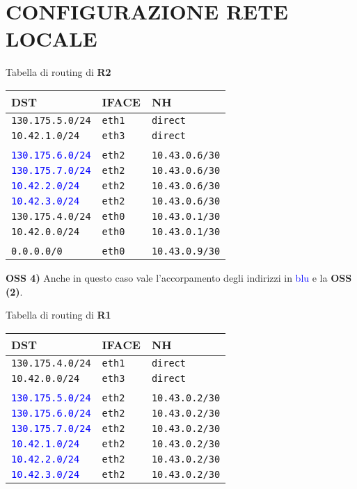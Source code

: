 \documentclass{article}
\def\code#1{\texttt{#1}}
\newenvironment{homeworkProblem}[1][-1]{
    \section{CONFIGURAZIONE RETE LOCALE}
}{}
\begin{document}
\begin{homeworkProblem}
	\pagebreak
	Tabella di routing di \textbf{R2}\\
	\begin{center}
 	\begin{tabular}{l l l}
  		\textbf{DST} & \textbf{IFACE} & \textbf{NH} \\
  		\hline
 		\code{130.175.5.0/24} & \code{eth1} & \code{direct} \\
 		\code{10.42.1.0/24}   & \code{eth3} & \code{direct} \\\\	
 		
 		\textcolor{blue}{\code{130.175.6.0/24}} & \code{eth2} & \code{10.43.0.6/30}\\
 		\textcolor{blue}{\code{130.175.7.0/24}} & \code{eth2} & \code{10.43.0.6/30}\\
 		\textcolor{blue}{\code{10.42.2.0/24}}   & \code{eth2} & \code{10.43.0.6/30}\\
 		\textcolor{blue}{\code{10.42.3.0/24}}   & \code{eth2} & \code{10.43.0.6/30}\\
 		
 		\code{130.175.4.0/24} & \code{eth0} & \code{10.43.0.1/30}\\
        \code{10.42.0.0/24}   & \code{eth0} & \code{10.43.0.1/30}\\\\    
 		
 		\code{0.0.0.0/0} & \code{eth0} & \code{10.43.0.9/30}\\ 		
 	\end{tabular}
	\end{center}	
	\textbf{OSS 4)} Anche in questo caso vale l'accorpamento degli indirizzi in \textcolor{blue}{blu} e la 
	\textbf{OSS (2)}.
	
	\textit{}\newline %
	Tabella di routing di \textbf{R1}\\
	\begin{center}
 	\begin{tabular}{l l l}
  		\textbf{DST} & \textbf{IFACE} & \textbf{NH} \\
  		\hline
 		\code{130.175.4.0/24} & \code{eth1} & \code{direct} \\
 		\code{10.42.0.0/24}   & \code{eth3} & \code{direct} \\\\	
 		
 		\textcolor{blue}{\code{130.175.5.0/24}} & \code{eth2} & \code{10.43.0.2/30}\\
 		\textcolor{blue}{\code{130.175.6.0/24}} & \code{eth2} & \code{10.43.0.2/30}\\
 		\textcolor{blue}{\code{130.175.7.0/24}} & \code{eth2} & \code{10.43.0.2/30}\\
 		\textcolor{blue}{\code{10.42.1.0/24}}   & \code{eth2} & \code{10.43.0.2/30}\\
 		\textcolor{blue}{\code{10.42.2.0/24}}   & \code{eth2} & \code{10.43.0.2/30}\\
 		\textcolor{blue}{\code{10.42.3.0/24}}   & \code{eth2} & \code{10.43.0.2/30}\\
 		

\end{tabular}
\end{center}
\end{homeworkProblem}
\end{document}
